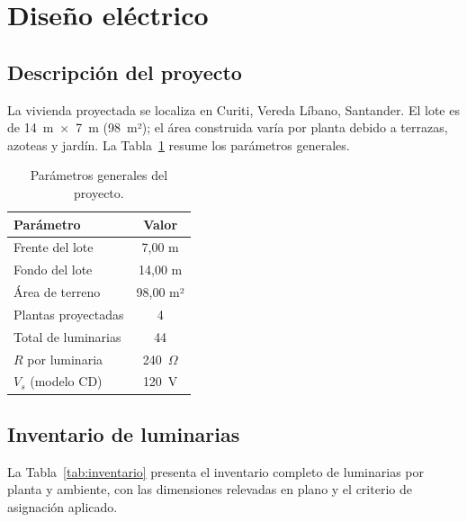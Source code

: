 \section{Diseño eléctrico}

\subsection{Descripción del proyecto}

La vivienda proyectada se localiza en Curiti, Vereda Líbano, Santander. El lote es de 14~m~$\times$~7~m (98~m²); el área construida varía por planta debido a terrazas, azoteas y jardín. La Tabla~\ref{tab:medidas} resume los parámetros generales.

\begin{table}[H]
\centering
\caption{Parámetros generales del proyecto.}
\label{tab:medidas}
\begin{tabular}{lc}
\toprule
\textbf{Parámetro} & \textbf{Valor} \\
\midrule
Frente del lote          & 7{,}00 m \\
Fondo del lote           & 14{,}00 m \\
Área de terreno          & 98{,}00 m² \\
Plantas proyectadas      & 4 \\
Total de luminarias      & 44 \\
$R$ por luminaria        & 240~$\Omega$ \\
$V_s$ (modelo CD)        & 120~V \\
\bottomrule
\end{tabular}
\end{table}

\subsection{Inventario de luminarias}

La Tabla~\ref{tab:inventario} presenta el inventario completo de luminarias por planta y ambiente, con las dimensiones relevadas en plano y el criterio de asignación aplicado.


